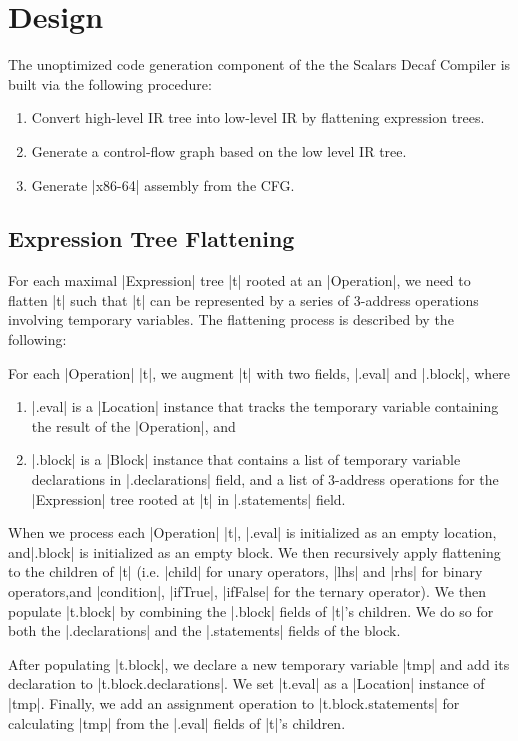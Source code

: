 \section{Design}

The unoptimized code generation component of the the Scalars Decaf Compiler is built via the following procedure:
\begin{enumerate}
    \item Convert high-level IR tree into low-level IR by flattening expression trees.
    \item Generate a control-flow graph based on the low level IR tree.
    \item Generate |x86-64| assembly from the CFG.
\end{enumerate}

\subsection{Expression Tree Flattening}
For each maximal |Expression| tree |t| rooted at an |Operation|, we need to flatten |t| such that |t| can be represented by a series of 3-address operations involving temporary variables. The flattening process is described by the following:

For each |Operation| |t|, we augment |t| with two fields, |.eval| and |.block|, where
\begin{enumerate}
    \item |.eval| is a |Location| instance that tracks the temporary variable containing the result of the |Operation|, and
    \item |.block| is a |Block| instance that contains a list of temporary variable declarations in |.declarations| field, and a list of 3-address operations for the |Expression| tree rooted at |t| in |.statements| field.
\end{enumerate}

When we process each |Operation| |t|, |.eval| is initialized as an empty location, and|.block| is initialized as an empty block. We then recursively apply flattening to the children of |t| (i.e. |child| for unary operators, |lhs| and |rhs| for binary operators,and |condition|, |ifTrue|, |ifFalse| for the ternary operator). We then populate |t.block| by combining the |.block| fields of |t|'s children. We do so for both the |.declarations| and the |.statements| fields of the block.

After populating |t.block|, we declare a new temporary variable |tmp| and add its declaration to |t.block.declarations|. We set |t.eval| as a |Location| instance of |tmp|. Finally, we add an assignment operation to |t.block.statements| for calculating |tmp| from the |.eval| fields of |t|'s children.

